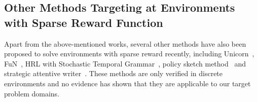 \subsection{Other Methods Targeting at Environments with Sparse Reward Function}
Apart from the above-mentioned works, several other methods have also been proposed to solve environments with sparse reward recently, including Unicorn~\cite{mankowitz2018unicorn}, FuN~\cite{vezhnevets2017feudal},  HRL with Stochastic Temporal Grammar~\cite{shu2017hierarchical}, policy sketch method~\cite{andreas2016modular} and strategic attentive writer~\cite{vezhnevets2016strategic}. These methods are only verified in discrete environments and no evidence has shown that they are applicable to our target problem domains.